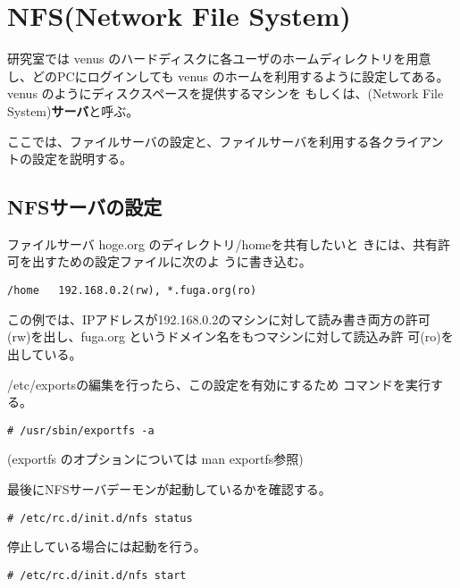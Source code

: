 \documentclass{jreport}
\begin{document}



\section{NFS(Network File System)}

研究室では venus のハードディスクに各ユーザのホームディレクトリを用意
し、どのPCにログインしても venus のホームを利用するように設定してある。
venus のようにディスクスペースを提供するマシンを
もしくは、(Network File System)\textbf{サーバ}と呼ぶ。

ここでは、ファイルサーバの設定と、ファイルサーバを利用する各クライアン
トの設定を説明する。


\subsection{NFSサーバの設定}

ファイルサーバ hoge.org のディレクトリ{\ttfamily /home}を共有したいと
きには、共有許可を出すための設定ファイルに次のよ
うに書き込む。
\begin{screen}
\begin{verbatim}
/home   192.168.0.2(rw), *.fuga.org(ro)
\end{verbatim}
\end{screen}

この例では、IPアドレスが192.168.0.2のマシンに対して読み書き両方の許可
(rw)を出し、fuga.org というドメイン名をもつマシンに対して読込み許
可(ro)を出している。

{\ttfamily /etc/exports}の編集を行ったら、この設定を有効にするため
コマンドを実行する。
\begin{screen}
\begin{verbatim}
# /usr/sbin/exportfs -a
\end{verbatim}
\end{screen}
(exportfs のオプションについては man exportfs参照)

最後にNFSサーバデーモンが起動しているかを確認する。
\begin{screen}
\begin{verbatim}
# /etc/rc.d/init.d/nfs status
\end{verbatim}
\end{screen}
停止している場合には起動を行う。
\begin{screen}
\begin{verbatim}
# /etc/rc.d/init.d/nfs start
\end{verbatim}
\end{screen}
\end{document}
